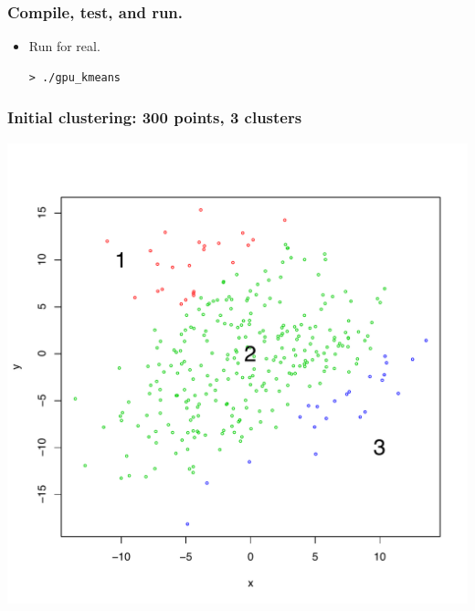 \documentclass[handout]{beamer}
\numberwithin{equation}{section}
\begin{document}
\begin{frame}[fragile]
\frametitle{Compile, test, and run.}
\begin{itemize}
\begin{lstlisting}
==13523== 
==13523== HEAP SUMMARY:
==13523==     in use at exit: 1,308,694 bytes in 2,469 blocks
==13523==   total heap usage: 4,479 allocs, 2,010 frees, 2,952,191 bytes allocated
==13523== 
==13523== LEAK SUMMARY:
==13523==    definitely lost: 16 bytes in 1 blocks
==13523==    indirectly lost: 0 bytes in 0 blocks
==13523==      possibly lost: 33,064 bytes in 242 blocks
==13523==    still reachable: 1,275,614 bytes in 2,226 blocks
==13523==         suppressed: 0 bytes in 0 blocks
==13523== Rerun with --leak-check=full to see details of leaked memory
==13523== 
==13523== For counts of detected and suppressed errors, rerun with: -v
==13523== ERROR SUMMARY: 0 errors from 0 contexts (suppressed: 11 from 9)
\end{lstlisting}
\pause \item Run for real.
\begin{lstlisting}
> ./gpu_kmeans
\end{lstlisting}
\end{itemize}
\end{frame}

\lstset{language = C}


\begin{frame}[fragile]
\frametitle{Initial clustering: 300 points, 3 clusters}
\begin{center}
\includegraphics[scale=.5]{../../fig/kmeans-before}
\end{center}
\end{frame}
\end{document}
